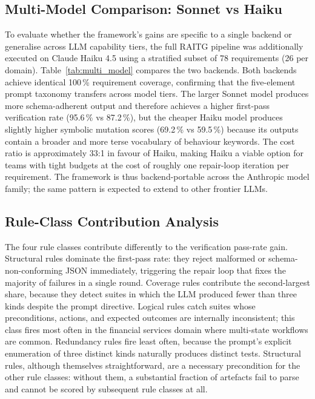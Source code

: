 \documentclass[conference]{IEEEtran}
\begin{document}
\subsection{Multi-Model Comparison: Sonnet vs Haiku}
\label{sec:multi_model}

To evaluate whether the framework's gains are specific to a single backend or generalise across LLM capability tiers, the full RAITG pipeline was additionally executed on Claude Haiku 4.5 using a stratified subset of 78 requirements (26 per domain). Table~\ref{tab:multi_model} compares the two backends. Both backends achieve identical 100\,\% requirement coverage, confirming that the five-element prompt taxonomy transfers across model tiers. The larger Sonnet model produces more schema-adherent output and therefore achieves a higher first-pass verification rate (95.6\,\% vs 87.2\,\%), but the cheaper Haiku model produces slightly higher symbolic mutation scores (69.2\,\% vs 59.5\,\%) because its outputs contain a broader and more terse vocabulary of behaviour keywords. The cost ratio is approximately 33:1 in favour of Haiku, making Haiku a viable option for teams with tight budgets at the cost of roughly one repair-loop iteration per requirement. The framework is thus backend-portable across the Anthropic model family; the same pattern is expected to extend to other frontier LLMs.

\begin{table}[!t]
\centering
\caption{Multi-model comparison: Claude Sonnet 4.6 vs Claude Haiku 4.5}
\label{tab:multi_model}


\end{table}

\subsection{Rule-Class Contribution Analysis}

The four rule classes contribute differently to the verification pass-rate gain. Structural rules dominate the first-pass rate: they reject malformed or schema-non-conforming JSON immediately, triggering the repair loop that fixes the majority of failures in a single round. Coverage rules contribute the second-largest share, because they detect suites in which the LLM produced fewer than three kinds despite the prompt directive. Logical rules catch suites whose preconditions, actions, and expected outcomes are internally inconsistent; this class fires most often in the financial services domain where multi-state workflows are common. Redundancy rules fire least often, because the prompt's explicit enumeration of three distinct kinds naturally produces distinct tests. Structural rules, although themselves straightforward, are a necessary precondition for the other rule classes: without them, a substantial fraction of artefacts fail to parse and cannot be scored by subsequent rule classes at all.
\end{document}
